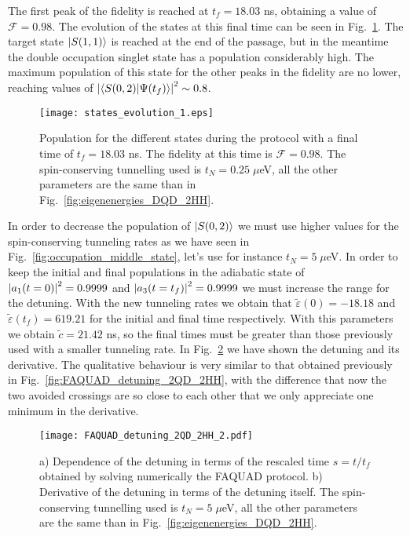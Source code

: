 The first peak of the fidelity is reached at $t_f=18.03$ ns, obtaining a value of $\mathcal{F}=0.98$. The evolution of the states at this final time can be seen in Fig.~\ref{fig:states_evolution_1}. The target state $\ket{S(1,1)}$ is reached at the end of the passage, but in the meantime the double occupation singlet state has a population considerably high. The maximum population of this state for the other peaks in the fidelity are no lower, reaching values of $\abs{\braket{S(0,2)}{\Psi(t_f)}}^2\sim 0.8$.
\begin{figure}[!htb]
	\centering
	\texttt{[image: states\_evolution\_1.eps]}
	\caption{Population for the different states during the protocol with a final time of $t_f=18.03$ ns. The fidelity at this time is $\mathcal{F}=0.98$. The spin-conserving tunnelling used is $t_N=0.25\; \mu$eV, all the other parameters are the same than in Fig.~\ref{fig:eigenenergies_DQD_2HH}.}
	\label{fig:states_evolution_1}
\end{figure}



In order to decrease the population of $\ket{S(0,2)}$ we must use higher values for the spin-conserving tunneling rates as we have seen in Fig.~\ref{fig:occupation_middle_state}, let's use for instance $t_N=5\; \mu$eV. In order to keep the initial and final populations in the adiabatic state of $\abs{a_1(t=0)}^2=0.9999$ and $\abs{a_3(t=t_f)}^2=0.9999$ we must increase the range for the detuning. With the new tunneling rates we obtain that $\tilde{\varepsilon}(0)=-18.18$ and $\tilde{\varepsilon}(t_f)=619.21$ for the initial and final time respectively. With this parameters we obtain $\tilde{c}=21.42$ ns, so the final times must be greater than those previously used with a smaller tunneling rate. In Fig.~\ref{fig:FAQUAD_detuning_2QD_2HH_2} we have shown the detuning and its derivative. The qualitative behaviour is very similar to that obtained previously in Fig.~\ref{fig:FAQUAD_detuning_2QD_2HH}, with the difference that now the two avoided crossings are so close to each other that we only appreciate one minimum in the derivative.
\begin{figure}[!htb]
	\centering
	\texttt{[image: FAQUAD\_detuning\_2QD\_2HH\_2.pdf]}
	\caption{a) Dependence of the detuning in terms of the rescaled time $s=t/t_f$ obtained by solving numerically the FAQUAD protocol. b) Derivative of the detuning in terms of the detuning itself. The spin-conserving tunnelling used is $t_N=5\; \mu$eV, all the other parameters are the same than in Fig.~\ref{fig:eigenenergies_DQD_2HH}.}
	\label{fig:FAQUAD_detuning_2QD_2HH_2}
\end{figure}

